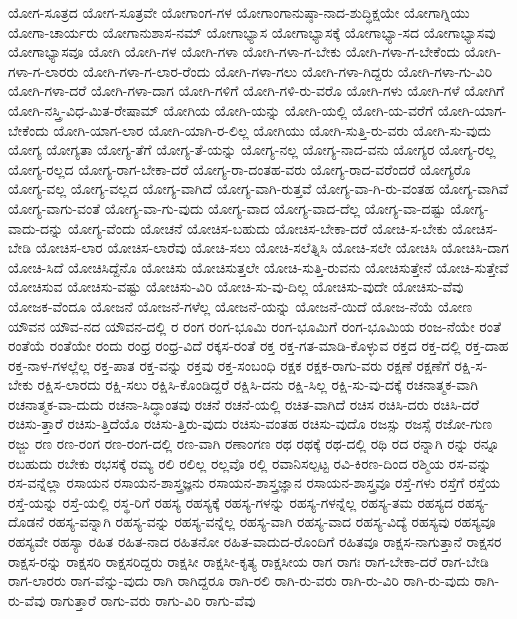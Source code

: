 {ಯೋಗ-ಸೂತ್ರದ
ಯೋಗ-ಸೂತ್ರವೇ
ಯೋಗಾಂಗ-ಗಳ
ಯೋಗಾಂಗಾನುಷ್ಠಾ-ನಾದ-ಶುದ್ಧಿಕ್ಷಯೇ
ಯೋಗಾಗ್ನಿಯು
ಯೋಗಾ-ಚಾರ್ಯರು
ಯೋಗಾನುಶಾಸ-ನಮ್
ಯೋಗಾಭ್ಯಾಸ
ಯೋಗಾಭ್ಯಾಸಕ್ಕೆ
ಯೋಗಾಭ್ಯಾ-ಸದ
ಯೋಗಾಭ್ಯಾಸವು
ಯೋಗಾಭ್ಯಾಸವೂ
ಯೋಗಿ
ಯೋಗಿ-ಗಳ
ಯೋಗಿ-ಗಳಾ
ಯೋಗಿ-ಗಳಾ-ಗ-ಬೇಕು
ಯೋಗಿ-ಗಳಾ-ಗ-ಬೇಕೆಂದು
ಯೋಗಿ-ಗಳಾ-ಗ-ಲಾರರು
ಯೋಗಿ-ಗಳಾ-ಗ-ಲಾರ-ರೆಂದು
ಯೋಗಿ-ಗಳಾ-ಗಲು
ಯೋಗಿ-ಗಳಾ-ಗಿದ್ದರು
ಯೋಗಿ-ಗಳಾ-ಗು-ವಿರಿ
ಯೋಗಿ-ಗಳಾ-ದರೆ
ಯೋಗಿ-ಗಳಾ-ದಾಗ
ಯೋಗಿ-ಗಳಿಗೆ
ಯೋಗಿ-ಗಳಿ-ರು-ವರೊ
ಯೋಗಿ-ಗಳು
ಯೋಗಿ-ಗಳೆ
ಯೋಗಿಗೆ
ಯೋಗಿ-ನಸ್ತ್ರಿ-ವಿಧ-ಮಿತ-ರೇಷಾಮ್
ಯೋಗಿಯ
ಯೋಗಿ-ಯನ್ನು
ಯೋಗಿ-ಯಲ್ಲಿ
ಯೋಗಿ-ಯ-ವರೆಗೆ
ಯೋಗಿ-ಯಾಗ-ಬೇಕೆಂದು
ಯೋಗಿ-ಯಾಗ-ಲಾರ
ಯೋಗಿ-ಯಾಗಿ-ರ-ಲಿಲ್ಲ
ಯೋಗಿಯು
ಯೋಗಿ-ಸುತ್ತಿ-ರು-ವರು
ಯೋಗಿ-ಸು-ವುದು
ಯೋಗ್ಯ
ಯೋಗ್ಯತಾ
ಯೋಗ್ಯ-ತೆಗೆ
ಯೋಗ್ಯ-ತೆ-ಯನ್ನು
ಯೋಗ್ಯ-ನಲ್ಲ
ಯೋಗ್ಯ-ನಾದ-ವನು
ಯೋಗ್ಯರ
ಯೋಗ್ಯ-ರಲ್ಲ
ಯೋಗ್ಯ-ರಲ್ಲದ
ಯೋಗ್ಯ-ರಾಗ-ಬೇಕಾ-ದರೆ
ಯೋಗ್ಯ-ರಾ-ದಂತಹ-ವರು
ಯೋಗ್ಯ-ರಾದ-ವರೆಂದರೆ
ಯೋಗ್ಯರೊ
ಯೋಗ್ಯ-ವಲ್ಲ
ಯೋಗ್ಯ-ವಲ್ಲದ
ಯೋಗ್ಯ-ವಾಗಿದೆ
ಯೋಗ್ಯ-ವಾಗಿ-ರುತ್ತವೆ
ಯೋಗ್ಯ-ವಾ-ಗಿ-ರು-ವಂತಹ
ಯೋಗ್ಯ-ವಾಗಿವೆ
ಯೋಗ್ಯ-ವಾಗು-ವಂತೆ
ಯೋಗ್ಯ-ವಾ-ಗು-ವುದು
ಯೋಗ್ಯ-ವಾದ
ಯೋಗ್ಯ-ವಾದ-ದೆಲ್ಲ
ಯೋಗ್ಯ-ವಾ-ದಷ್ಟು
ಯೋಗ್ಯ-ವಾದು-ದನ್ನು
ಯೋಗ್ಯ-ವೆಂದು
ಯೋಚನೆ
ಯೋಚಿಸ-ಬಹುದು
ಯೋಚಿಸ-ಬೇಕಾ-ದರೆ
ಯೋಚಿ-ಸ-ಬೇಕು
ಯೋಚಿಸ-ಬೇಡಿ
ಯೋಚಿಸ-ಲಾರ
ಯೋಚಿಸ-ಲಾರೆವು
ಯೋಚಿ-ಸಲು
ಯೋಚಿ-ಸಲೆತ್ನಿಸಿ
ಯೋಚಿ-ಸಲೇ
ಯೋಚಿಸಿ
ಯೋಚಿಸಿ-ದಾಗ
ಯೋಚಿ-ಸಿದೆ
ಯೋಚಿಸಿದ್ದೆನೊ
ಯೋಚಿಸು
ಯೋಚಿಸುತ್ತಲೇ
ಯೋಚಿ-ಸುತ್ತಿ-ರುವನು
ಯೋಚಿಸುತ್ತೇನೆ
ಯೋಚಿ-ಸುತ್ತೇವೆ
ಯೋಚಿಸುವ
ಯೋಚಿಸು-ವಷ್ಟು
ಯೋಚಿಸು-ವಿರಿ
ಯೋಚಿ-ಸು-ವು-ದಿಲ್ಲ
ಯೋಚಿಸು-ವುದೇ
ಯೋಚಿಸು-ವೆವು
ಯೋಜಕ-ವೆಂದೂ
ಯೋಜನೆ
ಯೋಜನೆ-ಗಳೆಲ್ಲ
ಯೋಜನೆ-ಯನ್ನು
ಯೋಜನೆ-ಯಿದೆ
ಯೋಜ-ನೆಯೆ
ಯೋಣ
ಯೌವನ
ಯೌವ-ನದ
ಯೌವನ-ದಲ್ಲಿ
ರ
ರಂಗ
ರಂಗ-ಭೂಮಿ
ರಂಗ-ಭೂಮಿಗೆ
ರಂಗ-ಭೂಮಿಯ
ರಂಜ-ನೆಯೇ
ರಂತೆ
ರಂತೆಯೆ
ರಂತೆಯೇ
ರಂದು
ರಂಧ್ರ
ರಂಧ್ರ-ವಿದೆ
ರಕ್ಕಸ-ರಂತೆ
ರಕ್ತ
ರಕ್ತ-ಗತ-ಮಾಡಿ-ಕೊಳ್ಳುವ
ರಕ್ತದ
ರಕ್ತ-ದಲ್ಲಿ
ರಕ್ತ-ದಾಹ
ರಕ್ತ-ನಾಳ-ಗಳಲ್ಲೆಲ್ಲ
ರಕ್ತ-ಪಾತ
ರಕ್ತ-ವನ್ನು
ರಕ್ತವು
ರಕ್ತ-ಸಂಬಂಧಿ
ರಕ್ಷಕ
ರಕ್ಷಕ-ರಾಗು-ವರು
ರಕ್ಷಣೆ
ರಕ್ಷಣೆಗೆ
ರಕ್ಷಿ-ಸ-ಬೇಕು
ರಕ್ಷಿಸ-ಲಾರದು
ರಕ್ಷಿ-ಸಲು
ರಕ್ಷಿಸಿ-ಕೊಂಡಿದ್ದರೆ
ರಕ್ಷಿಸಿ-ದನು
ರಕ್ಷಿ-ಸಿಲ್ಲ
ರಕ್ಷಿ-ಸು-ವು-ದಕ್ಕೆ
ರಚನಾತ್ಮಕ-ವಾಗಿ
ರಚನಾತ್ಮಕ-ವಾ-ದುದು
ರಚನಾ-ಸಿದ್ಧಾಂತವು
ರಚನೆ
ರಚನೆ-ಯಲ್ಲಿ
ರಚಿತ-ವಾಗಿದೆ
ರಚಿಸ
ರಚಿಸಿ-ದರು
ರಚಿಸಿ-ದರೆ
ರಚಿಸು-ತ್ತಾರೆ
ರಚಿಸು-ತ್ತಿದೆಯೊ
ರಚಿಸು-ತ್ತಿರು-ವುದು
ರಚಿಸು-ವಂತಹ
ರಚಿಸು-ವುದೊ
ರಜಸ್ಸು
ರಜಸ್ಸೆ
ರಜೋ-ಗುಣ
ರಜ್ಜು
ರಣ
ರಣ-ರಂಗ
ರಣ-ರಂಗ-ದಲ್ಲಿ
ರಣ-ವಾಗಿ
ರಣಾಂಗಣ
ರಥ
ರಥಕ್ಕೆ
ರಥ-ದಲ್ಲಿ
ರಥಿ
ರದ
ರನ್ನಾಗಿ
ರನ್ನು
ರನ್ನೂ
ರಬಹುದು
ರಬೇಕು
ರಭಸಕ್ಕೆ
ರಮ್ಯ
ರಲಿ
ರಲಿಲ್ಲ
ರಲ್ಲವೊ
ರಲ್ಲಿ
ರವಾನಿಸಲ್ಪಟ್ಟ
ರವಿ-ಕಿರಣ-ದಿಂದ
ರಶ್ಮಿಯ
ರಸ-ವನ್ನು
ರಸ-ವನ್ನೆಲ್ಲಾ
ರಸಾಯನ
ರಸಾಯನ-ಶಾಸ್ತ್ರಜ್ಞನು
ರಸಾಯನ-ಶಾಸ್ತ್ರಜ್ಞಾನ
ರಸಾಯನ-ಶಾಸ್ತ್ರವೂ
ರಸ್ತೆ-ಗಳು
ರಸ್ತೆಗೆ
ರಸ್ತೆಯ
ರಸ್ತೆ-ಯನ್ನು
ರಸ್ತೆ-ಯಲ್ಲಿ
ರಸ್ಥ-ರಿಗೆ
ರಹಸ್ಯ
ರಹಸ್ಯಕ್ಕೆ
ರಹಸ್ಯ-ಗಳನ್ನು
ರಹಸ್ಯ-ಗಳನ್ನೆಲ್ಲ
ರಹಸ್ಯ-ತಮ
ರಹಸ್ಯದ
ರಹಸ್ಯ-ದೊಡನೆ
ರಹಸ್ಯ-ವನ್ನಾಗಿ
ರಹಸ್ಯ-ವನ್ನು
ರಹಸ್ಯ-ವನ್ನೆಲ್ಲ
ರಹಸ್ಯ-ವಾಗಿ
ರಹಸ್ಯ-ವಾದ
ರಹಸ್ಯ-ವಿದ್ಯೆ
ರಹಸ್ಯವು
ರಹಸ್ಯವೂ
ರಹಸ್ಯವೇ
ರಹಸ್ಯಾ
ರಹಿತ
ರಹಿತ-ನಾದ
ರಹಿತನೋ
ರಹಿತ-ವಾದುದ-ರೊಂದಿಗೆ
ರಹಿತವೂ
ರಾಕ್ಷಸ-ನಾಗುತ್ತಾನೆ
ರಾಕ್ಷಸರ
ರಾಕ್ಷಸ-ರನ್ನು
ರಾಕ್ಷಸರಿ
ರಾಕ್ಷಸರಿದ್ದರು
ರಾಕ್ಷಸೀ
ರಾಕ್ಷಸೀ-ಕೃತ್ಯ
ರಾಕ್ಷಸೀಯ
ರಾಗ
ರಾಗಃ
ರಾಗ-ಬೇಕಾ-ದರೆ
ರಾಗ-ಬೇಡಿ
ರಾಗ-ಲಾರರು
ರಾಗ-ವೆನ್ನು-ವುದು
ರಾಗಿ
ರಾಗಿದ್ದರೂ
ರಾಗಿ-ರಲಿ
ರಾಗಿ-ರು-ವರು
ರಾಗಿ-ರು-ವಿರಿ
ರಾಗಿ-ರು-ವುದು
ರಾಗಿ-ರು-ವೆವು
ರಾಗುತ್ತಾರೆ
ರಾಗು-ವರು
ರಾಗು-ವಿರಿ
ರಾಗು-ವೆವು
}
